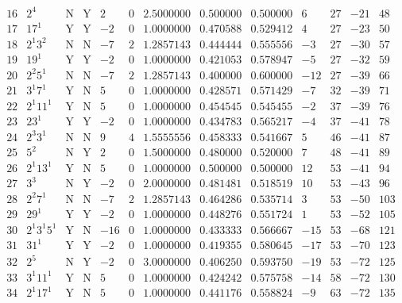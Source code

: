 \documentclass[11pt,reqno,a4letter]{article}
\numberwithin{equation}{section}
\numberwithin{figure}{section}
\numberwithin{table}{section}
\theoremstyle{plain}
\numberwithin{theorem}{section}
\theoremstyle{definition}
\begin{document}
\begin{table}[ht!]
\begin{equation*}
{\begin{array}{cc|cc|ccc|cc|cccc}
 16 & 2^4 & \text{N} & \text{Y} & 2 & 0 & 2.5000000 & 0.500000 & 0.500000 & 6 & 27 & -21 & 48 \\
 17 & 17^1 & \text{Y} & \text{Y} & -2 & 0 & 1.0000000 & 0.470588 & 0.529412 & 4 & 27 & -23 & 50 \\
 18 & 2^1 3^2 & \text{N} & \text{N} & -7 & 2 & 1.2857143 & 0.444444 & 0.555556 & -3 & 27 & -30 & 57 \\
 19 & 19^1 & \text{Y} & \text{Y} & -2 & 0 & 1.0000000 & 0.421053 & 0.578947 & -5 & 27 & -32 & 59 \\
 20 & 2^2 5^1 & \text{N} & \text{N} & -7 & 2 & 1.2857143 & 0.400000 & 0.600000 & -12 & 27 & -39 & 66 \\
 21 & 3^1 7^1 & \text{Y} & \text{N} & 5 & 0 & 1.0000000 & 0.428571 & 0.571429 & -7 & 32 & -39 & 71 \\
 22 & 2^1 11^1 & \text{Y} & \text{N} & 5 & 0 & 1.0000000 & 0.454545 & 0.545455 & -2 & 37 & -39 & 76 \\
 23 & 23^1 & \text{Y} & \text{Y} & -2 & 0 & 1.0000000 & 0.434783 & 0.565217 & -4 & 37 & -41 & 78 \\
 24 & 2^3 3^1 & \text{N} & \text{N} & 9 & 4 & 1.5555556 & 0.458333 & 0.541667 & 5 & 46 & -41 & 87 \\
 25 & 5^2 & \text{N} & \text{Y} & 2 & 0 & 1.5000000 & 0.480000 & 0.520000 & 7 & 48 & -41 & 89 \\
 26 & 2^1 13^1 & \text{Y} & \text{N} & 5 & 0 & 1.0000000 & 0.500000 & 0.500000 & 12 & 53 & -41 & 94 \\
 27 & 3^3 & \text{N} & \text{Y} & -2 & 0 & 2.0000000 & 0.481481 & 0.518519 & 10 & 53 & -43 & 96 \\
 28 & 2^2 7^1 & \text{N} & \text{N} & -7 & 2 & 1.2857143 & 0.464286 & 0.535714 & 3 & 53 & -50 & 103 \\
 29 & 29^1 & \text{Y} & \text{Y} & -2 & 0 & 1.0000000 & 0.448276 & 0.551724 & 1 & 53 & -52 & 105 \\
 30 & 2^1 3^1 5^1 & \text{Y} & \text{N} & -16 & 0 & 1.0000000 & 0.433333 & 0.566667 & -15 & 53 & -68 & 121 \\
 31 & 31^1 & \text{Y} & \text{Y} & -2 & 0 & 1.0000000 & 0.419355 & 0.580645 & -17 & 53 & -70 & 123 \\
 32 & 2^5 & \text{N} & \text{Y} & -2 & 0 & 3.0000000 & 0.406250 & 0.593750 & -19 & 53 & -72 & 125 \\
 33 & 3^1 11^1 & \text{Y} & \text{N} & 5 & 0 & 1.0000000 & 0.424242 & 0.575758 & -14 & 58 & -72 & 130 \\
 34 & 2^1 17^1 & \text{Y} & \text{N} & 5 & 0 & 1.0000000 & 0.441176 & 0.558824 & -9 & 63 & -72 & 135 \\

\end{array}}
\end{equation*}
\end{table}
\end{document}
